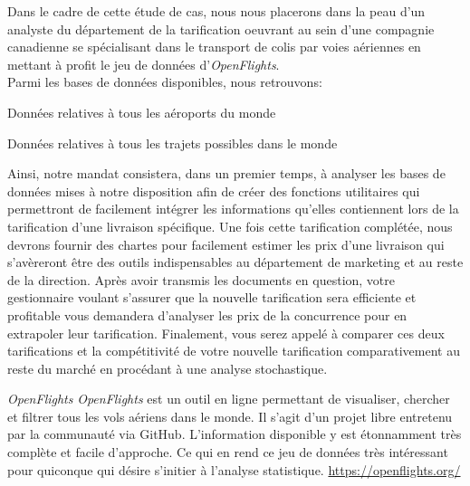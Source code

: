 Dans le cadre de cette étude de cas, nous nous placerons dans la peau d'un analyste du département de la tarification oeuvrant au sein d'une compagnie canadienne se spécialisant dans le transport de colis par voies aériennes en mettant à profit le jeu de données d'\emph{OpenFlights}. \cite{OpenFlightsData} 
 \\
Parmi les bases de données disponibles, nous retrouvons:
\begin{description}[style=multiline,leftmargin=2.5cm]
	\item[airports.dat] Données relatives à tous les aéroports du monde \cite{Data:RouteWorlwide}
	\item[routes.dat] Données relatives à tous les trajets possibles dans le monde \cite{Data:AirportWorlwide}
\end{description}
\vspace{\baselineskip}
Ainsi, notre mandat consistera, dans un premier temps, à analyser les bases de données mises à notre disposition afin de créer des fonctions utilitaires qui permettront de facilement intégrer les informations qu'elles contiennent lors de la tarification d'une livraison spécifique. Une fois cette tarification complétée, nous devrons fournir des chartes pour facilement estimer les prix d'une livraison qui s'avèreront être des outils indispensables au département de marketing et au reste de la direction. Après avoir transmis les documents en question, votre gestionnaire voulant s'assurer que la nouvelle tarification sera efficiente et profitable vous demandera d'analyser les prix de la concurrence pour en extrapoler leur tarification. Finalement, vous serez appelé à comparer ces deux tarifications et la compétitivité de votre nouvelle tarification comparativement au reste du marché en procédant à une analyse stochastique.

\begin{moreInfo}{\emph{OpenFlights}}
	\emph{OpenFlights} est un outil en ligne permettant de visualiser, chercher et filtrer tous les vols aériens dans le monde. Il s’agit d’un projet libre entretenu par la communauté via GitHub. \cite{GitHub} L’information disponible y est étonnamment très complète et facile d’approche. Ce qui en rend ce jeu de données très intéressant pour quiconque qui désire s’initier à l’analyse statistique.
	\url{https://openflights.org/}
\end{moreInfo}

